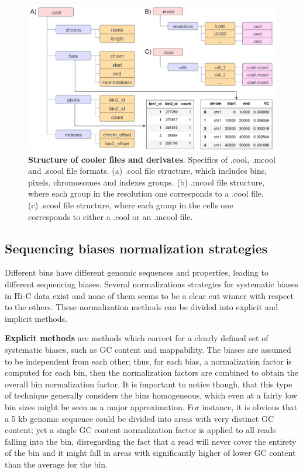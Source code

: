 \begin{figure}
  \centering
  \includegraphics[width=1\textwidth]{cooler_format.png}
  \caption{\textbf{Structure of cooler files and derivates}. Specifics of .cool, .mcool and .scool file formats. (a) .cool file structure, which includes bins, pixels, chromosomes and indexes groups. (b) .mcool file structure, where each group in the resolution one corresponds to a .cool file. (c) .scool file structure, where each group in the cells one corresponds to either a .cool or an .mcool file.}
  \label{fig:cooler}
\end{figure}

\subsection{Sequencing biases normalization strategies}

Different bins have different genomic sequences and properties, leading to different sequencing biases. Several normalizations strategies for systematic biases in Hi-C data exist and none of them seems to be a clear cut winner with respect to the others\cite{normalization2020}. These normalization methods can be divided into explicit and implicit methods. 

\textbf{Explicit methods} are methods which correct for a clearly defined set of systematic biases, such as GC content and mappability. The biases are assumed to be independent from each other; thus, for each bias, a normalization factor is computed for each bin, then the normalization factors are combined to obtain the overall bin normalization factor. It is important to notice though, that this type of technique generally considers the bins homogeneous, which even at a fairly low bin sizes might be seen as a major approximation. For instance, it is obvious that a 5 kb genomic sequence could be divided into areas with very distinct GC content; yet a single GC content normalization factor is applied to all reads falling into the bin, disregarding the fact that a read will never cover the entirety of the bin and it might fall in areas with significantly higher of lower GC content than the average for the bin.

